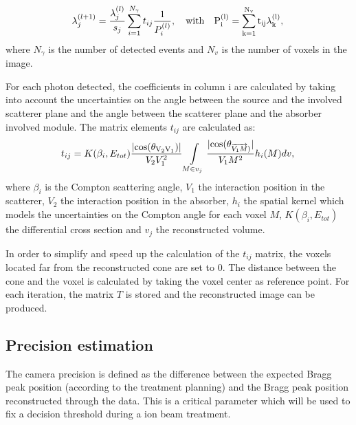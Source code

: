\begin{equation}
\lambda_j^{(l+1)} =  \frac{\lambda_j^{(l)} }{s_j} \sum\limits_{i=1}^{N_{\gamma}} t_{ij} \frac{1}{P_i^{(l)}},\quad \rm{with}\quad  P_i^{(l)}=\sum\limits_{k=1}^{N_{v}} t_{ij}\lambda_k^{(l)},
 \label{eq:equation_lambda_compton_med_nucleaire}\newline
\end{equation}
where $N_{\gamma}$ is the number of detected events and $N_v$ is the number of voxels in the image.\newline

For each photon detected, the coefficients in column i are calculated by taking into account the uncertainties on the angle between the source and the involved scatterer plane and the angle between the scatterer plane and the absorber involved module.
The matrix elements $t_{ij}$ are calculated as:
\begin{equation}
 t_{ij} = K(\beta_i,E_{tot})\frac{|\rm{cos}(\theta_{{V_2V_1}}) |}{V_2V_1^2} \int\limits_{M\in v_j} \frac{|\rm{cos}(\theta_{\overrightarrow{V_1M})}| }{V_1M^2} h_i(M)dv,
 \label{eq:equation_tij_compton_med_nucleaire}\newline
\end{equation}
where $\beta_i$ is the Compton scattering angle, $V_1$ the interaction position in the scatterer, $V_2$ the interaction position in the absorber, $h_i$ the spatial kernel which models the uncertainties on the Compton angle for each voxel $M$, $K(\beta_i,E_{tot})$ the differential cross section and $v_j$ the reconstructed volume.\newline

In order to simplify and speed up the calculation of the $t_{ij}$ matrix, the voxels located far from the reconstructed cone are set to 0. The distance between the cone and the voxel is calculated by taking the voxel center as reference point. \newline%
For each iteration, the matrix $T$ is stored and the reconstructed image can be produced.

\subsection{Precision estimation}
\label{MatMeth:precision}

The camera precision is defined as the difference between the expected Bragg peak position (according to the treatment planning) and the Bragg peak position reconstructed through the data. This is a critical parameter which will be used to fix a decision threshold during a ion beam treatment.
 
